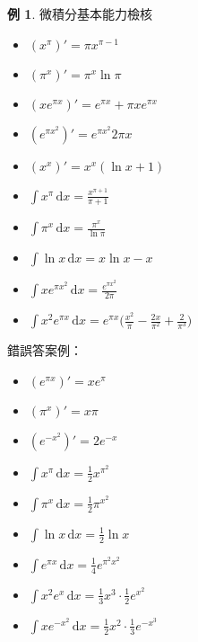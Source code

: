 \documentclass[12pt]{extarticle}
\newcommand{\ds}{\displaystyle}
\theoremstyle{definition}
\newtheorem*{ex}{例}
\begin{document}
\begin{ex} 微積分基本能力檢核
  \begin{multicols}{2}
    \begin{itemize}
      \item $\ds(x^\pi)' = \pi x^{\pi - 1}$
      \item $\ds(\pi^x)' = \pi^x\ln\pi$
      \item $\ds(xe^{\pi x})' = e^{\pi x} + \pi x e^{\pi x}$
      \item $\ds(e^{\pi x^2})' = e^{\pi x^2}2\pi x$
      \item $\ds(x^x)' = x^x(\ln x + 1)$
      \item $\ds\int x^\pi\,\text{d}x = \frac{x^{\pi + 1}}{\pi + 1}$
      \item $\ds\int\pi^x\,\text{d}x = \frac{\pi^{x}}{\ln\pi}$
      \item $\ds\int\ln x\,\text{d}x = x\ln x - x$
      \item $\ds\int x e^{\pi x^2}\,\text{d}x = \frac{e^{\pi x^2}}{2\pi}$
      \item $\ds\int x^2 e^{\pi x}\,\text{d}x = e^{\pi x}\Big(\frac{x^2}{\pi} - \frac{2x}{\pi^2} + \frac{2}{\pi^3}\Big)$
    \end{itemize}
  \end{multicols}
 
  錯誤答案例：
  \begin{multicols}{3}
    \begin{itemize}
      \item $\ds(e^{\pi x})' = xe^{\pi}$
      \item $\ds(\pi^x)' = x\pi$
      \item $\ds(e^{-x^2})' = 2e^{-x}$
      \item $\ds\int x^{\pi}\,\text{d}x = \frac{1}{2}x^{\pi^2}$
      \item $\ds\int\pi^x\,\text{d}x = \frac{1}{2}\pi^{x^2}$
      \item $\ds\int\ln x\,\text{d}x = \frac{1}{2}\ln x$
      \item $\ds\int e^{\pi x}\,\text{d}x = \frac{1}{4}e^{\pi^2 x^2}$
      \item $\ds\int x^2 e^x\,\text{d}x = \frac{1}{3}x^3\cdot\frac{1}{2}e^{x^2}$
      \item $\ds\int xe^{-x^2}\,\text{d}x = \frac{1}{2}x^2\cdot\frac{1}{3}e^{-x^3}$
    \end{itemize}
  \end{multicols}

\end{ex}
\end{document}
